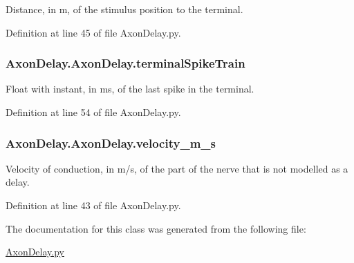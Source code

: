 Distance, in m, of the stimulus position to the terminal. 



Definition at line 45 of file Axon\-Delay.\-py.

\hypertarget{class_axon_delay_1_1_axon_delay_aba392d8938766355063cf4bf3a87962d}{
\subsubsection[{terminal\-Spike\-Train}]{\setlength{\rightskip}{0pt plus 5cm}Axon\-Delay.\-Axon\-Delay.\-terminal\-Spike\-Train}}\label{class_axon_delay_1_1_axon_delay_aba392d8938766355063cf4bf3a87962d}


Float with instant, in ms, of the last spike in the terminal. 



Definition at line 54 of file Axon\-Delay.\-py.

\hypertarget{class_axon_delay_1_1_axon_delay_a59cc448f95b38b88b7103c3058e8c397}{
\subsubsection[{velocity\-\_\-m\-\_\-s}]{\setlength{\rightskip}{0pt plus 5cm}Axon\-Delay.\-Axon\-Delay.\-velocity\-\_\-m\-\_\-s}}\label{class_axon_delay_1_1_axon_delay_a59cc448f95b38b88b7103c3058e8c397}


Velocity of conduction, in m/s, of the part of the nerve that is not modelled as a delay. 



Definition at line 43 of file Axon\-Delay.\-py.



The documentation for this class was generated from the following file\-:\begin{DoxyCompactItemize}
\item 
\hyperlink{_axon_delay_8py}{Axon\-Delay.\-py}\end{DoxyCompactItemize}

